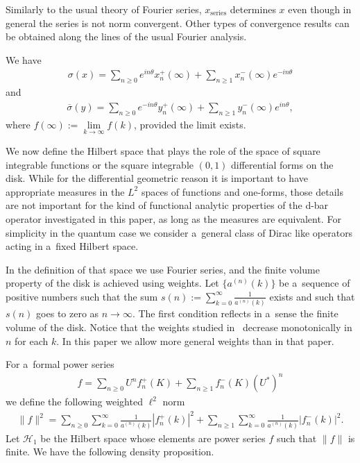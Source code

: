 Similarly to the usual theory of Fourier series, $x_\textrm{series}$ determines $x$ even though in general the series is
not norm convergent.
Other types of convergence results can be obtained along the lines of the usual Fourier analysis.

We have
\begin{gather}
\label{lim_at_infty1}
\sigma(x) = \sum\limits_{n\ge0} e^{in\theta}x_n^+(\infty) + \sum\limits_{n\ge1} x_n^-(\infty)e^{-in\theta}
\end{gather}
and
\begin{gather}
\label{lim_at_infty2}
\overline{\sigma}(y) = \sum\limits_{n\ge0} e^{-in\theta} y_n^+(\infty) + \sum\limits_{n\ge1} y_n^-(\infty)e^{in\theta},
\end{gather}
where $f(\infty):=\lim\limits_{k\to\infty}f(k)$, provided the limit exists.

We now def\/ine the Hilbert space that plays the role of the space of square integrable functions or the square integrable
$(0,1)$ dif\/ferential forms on the disk.
While for the dif\/ferential geometric reason it is important to have appropriate measures in the $L^2$ spaces of
functions and one-forms, those details are not important for the kind of functional analytic properties of the d-bar
operator investigated in this paper, as long as the measures are equivalent.
For simplicity in the quantum case we consider a~general class of Dirac like operators acting in a~f\/ixed Hilbert space.

In the def\/inition of that space we use Fourier series, and the f\/inite volume property of the disk is achieved using
weights.
Let $\{a^{(n)}(k)\}$ be a~sequence of positive numbers such that the sum $s(n):=\sum\limits_{k=0}^\infty
\frac{1}{a^{(n)}(k)}$ exists and such that $s(n)$ goes to zero as $n\to\infty$.
The f\/irst condition ref\/lects in a~sense the f\/inite volume of the disk.
Notice that the weights studied in~\cite{KM1} decrease monotonically in $n$ for each $k$.
In this paper we allow more general weights than in that paper.

For a~formal power series
\begin{gather*}
f = \sum\limits_{n\ge0} U^n f_n^+(K) + \sum\limits_{n\ge1} f_n^-(K)(U^*)^n
\end{gather*}
we def\/ine the following weighted $\ell^2$ norm
\begin{gather*}
\|f\|^2 = \sum\limits_{n\ge 0} \sum\limits_{k=0}^\infty \frac{1}{a^{(n)}(k)}|f_n^+(k)|^2 +
\sum\limits_{n\ge1}\sum\limits_{k=0}^\infty \frac{1}{a^{(n)}(k)}|f_n^-(k)|^2.
\end{gather*}
Let $\mathcal{H}_1$ be the Hilbert space whose elements are power series $f$ such that $\|f\|$ is f\/inite.
We have the following density proposition.


